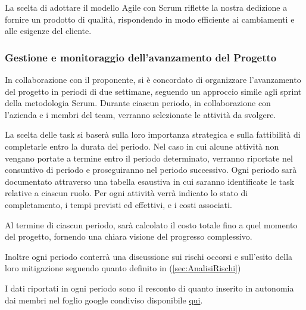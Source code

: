 La scelta di adottare il modello Agile con Scrum riflette la nostra dedizione a fornire un prodotto di qualità, rispondendo in modo efficiente ai cambiamenti e alle esigenze del cliente.

\subsubsection{Gestione e monitoraggio dell'avanzamento del Progetto}
In collaborazione con il proponente, si è concordato di organizzare l'avanzamento del progetto in periodi di due settimane, seguendo un approccio simile agli sprint della metodologia Scrum. Durante ciascun periodo, in collaborazione con l'azienda e i membri del team, verranno selezionate le attività da svolgere.

La scelta delle task si baserà sulla loro importanza strategica e sulla fattibilità di completarle entro la durata del periodo. Nel caso in cui alcune attività non vengano portate a termine entro il periodo determinato, verranno riportate nel consuntivo di periodo e proseguiranno nel periodo successivo.
Ogni periodo sarà documentato attraverso una tabella esaustiva in cui saranno identificate le task relative a ciascun ruolo. Per ogni attività verrà indicato lo stato di completamento, i tempi previsti ed effettivi, e i costi associati.



Al termine di ciascun periodo, sarà calcolato il costo totale fino a quel momento del progetto, fornendo una chiara visione del progresso complessivo.

Inoltre ogni periodo conterrà una discussione sui rischi occorsi e sull'esito della loro mitigazione seguendo quanto definito in (\ref{sec:AnalisiRischi})

I dati riportati in ogni periodo sono il resconto di quanto inserito in autonomia dai membri nel foglio google condiviso disponibile
\href{https://docs.google.com/spreadsheets/d/1gbGCTKO6tLKN7lI9kTZHLpoItniJIi9X/edit?usp=sharing&ouid=104272518979154193028&rtpof=true&sd=true}{qui}.

